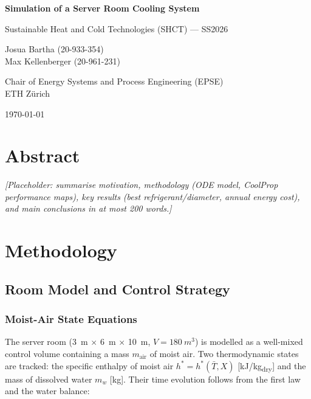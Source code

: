 \documentclass[12pt, a4paper]{article}
\newcommand{\hstar}{h^{*}}
\begin{document}
\begin{titlepage}
\centering
\vspace*{2cm}
{\huge\bfseries\color{epseblue} Simulation of a Server Room Cooling System\par}
\vspace{1cm}
{\Large Sustainable Heat and Cold Technologies (SHCT) --- SS2026\par}
\vspace{2cm}
{\large
  Josua Bartha \quad (20-933-354) \\[0.4em]
  Max Kellenberger \quad (20-961-231)
\par}
\vspace{1cm}
{\large Chair of Energy Systems and Process Engineering (EPSE)\\
ETH Zürich\par}
\vfill
{\large \today\par}
\end{titlepage}

\section{Abstract}
\label{sec:abstract}

\textit{[Placeholder: summarise motivation, methodology (ODE model, CoolProp performance maps), key results (best refrigerant/diameter, annual energy cost), and main conclusions in at most 200 words.]}

\section{Methodology}
\label{sec:method}

\subsection{Room Model and Control Strategy}
\label{sec:room}

\subsubsection{Moist-Air State Equations}

The server room (\SI{3}{m} $\times$ \SI{6}{m} $\times$ \SI{10}{m}, $V = \SI{180}{m^3}$) is modelled as a
well-mixed control volume containing a mass $m_{\mathrm{air}}$ of moist air.
Two thermodynamic states are tracked: the specific enthalpy of moist air
$\hstar = h^*(\bar{T},X)$ [\si{kJ/kg_{dry}}] and the mass of dissolved water
$m_w$ [\si{kg}].
Their time evolution follows from the first law and the water balance:
\end{document}
